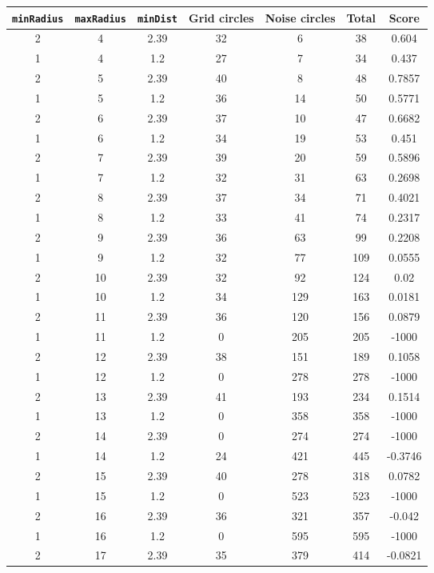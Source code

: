 \documentclass[letterpaper, 12pt]{article}
\begin{document}
\begin{longtable}{|c|c|c|c|c|c|c|}
\hline
\textbf{\texttt{minRadius}} & \textbf{\texttt{maxRadius}} & \textbf{\texttt{minDist}} & \textbf{Grid circles} & \textbf{Noise circles} & \textbf{Total} & \textbf{Score} \\
\hline
2 & 4 & 2.39 & 32 & 6 & 38 & 0.604 \\
\hline
1 & 4 & 1.2 & 27 & 7 & 34 & 0.437 \\
\hline
2 & 5 & 2.39 & 40 & 8 & 48 & 0.7857 \\
\hline
1 & 5 & 1.2 & 36 & 14 & 50 & 0.5771 \\
\hline
2 & 6 & 2.39 & 37 & 10 & 47 & 0.6682 \\
\hline
1 & 6 & 1.2 & 34 & 19 & 53 & 0.451 \\
\hline
2 & 7 & 2.39 & 39 & 20 & 59 & 0.5896 \\
\hline
1 & 7 & 1.2 & 32 & 31 & 63 & 0.2698 \\
\hline
2 & 8 & 2.39 & 37 & 34 & 71 & 0.4021 \\
\hline
1 & 8 & 1.2 & 33 & 41 & 74 & 0.2317 \\
\hline
2 & 9 & 2.39 & 36 & 63 & 99 & 0.2208 \\
\hline
1 & 9 & 1.2 & 32 & 77 & 109 & 0.0555 \\
\hline
2 & 10 & 2.39 & 32 & 92 & 124 & 0.02 \\
\hline
1 & 10 & 1.2 & 34 & 129 & 163 & 0.0181 \\
\hline
2 & 11 & 2.39 & 36 & 120 & 156 & 0.0879 \\
\hline
1 & 11 & 1.2 & 0 & 205 & 205 & -1000 \\
\hline
2 & 12 & 2.39 & 38 & 151 & 189 & 0.1058 \\
\hline
1 & 12 & 1.2 & 0 & 278 & 278 & -1000 \\
\hline
2 & 13 & 2.39 & 41 & 193 & 234 & 0.1514 \\
\hline
1 & 13 & 1.2 & 0 & 358 & 358 & -1000 \\
\hline
2 & 14 & 2.39 & 0 & 274 & 274 & -1000 \\
\hline
1 & 14 & 1.2 & 24 & 421 & 445 & -0.3746 \\
\hline
2 & 15 & 2.39 & 40 & 278 & 318 & 0.0782 \\
\hline
1 & 15 & 1.2 & 0 & 523 & 523 & -1000 \\
\hline
2 & 16 & 2.39 & 36 & 321 & 357 & -0.042 \\
\hline
1 & 16 & 1.2 & 0 & 595 & 595 & -1000 \\
\hline
2 & 17 & 2.39 & 35 & 379 & 414 & -0.0821 \\

\end{longtable}
\end{document}
